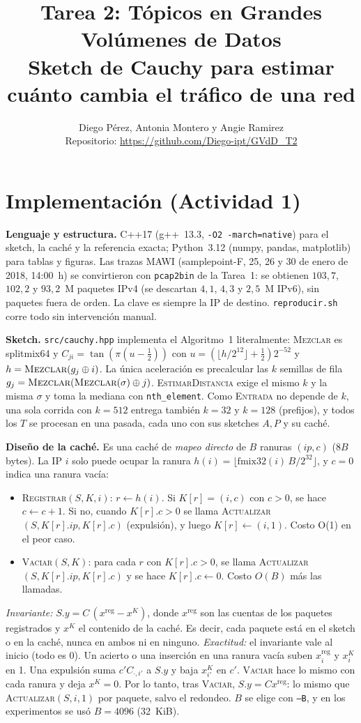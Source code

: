 \documentclass[conference]{IEEEtran}
\title{Tarea 2: Tópicos en Grandes Volúmenes de Datos\\
Sketch de Cauchy para estimar cuánto cambia el tráfico de una red}
\author{Diego Pérez, Antonia Montero y Angie Ramirez\\
Repositorio: \url{https://github.com/Diego-ipt/GVdD_T2}}
\begin{document}
\maketitle

\section{Implementación (Actividad 1)}

\textbf{Lenguaje y estructura.} C++17 (g++~13.3, \texttt{-O2 -march=native}) para el sketch, la caché y la referencia exacta; Python~3.12 (numpy, pandas, matplotlib) para tablas y figuras. Las trazas MAWI (samplepoint-F, 25, 26 y 30 de enero de 2018, 14:00~h) se convirtieron con \texttt{pcap2bin} de la Tarea~1: se obtienen $103{,}7$, $102{,}2$ y $93{,}2$~M paquetes IPv4 (se descartan $4{,}1$, $4{,}3$ y $2{,}5$~M IPv6), sin paquetes fuera de orden. La clave es siempre la IP de destino. \texttt{reproducir.sh} corre todo sin intervención manual.

\textbf{Sketch.} \texttt{src/cauchy.hpp} implementa el Algoritmo~1 literalmente: \textsc{Mezclar} es splitmix64 y $C_{ji}=\tan(\pi(u-\frac12))$ con $u=(\lfloor h/2^{12}\rfloor+\frac12)2^{-52}$ y $h=\textsc{Mezclar}(g_j\oplus i)$. La única aceleración es precalcular las $k$ semillas de fila $g_j=\textsc{Mezclar}(\textsc{Mezclar}(\sigma)\oplus j)$. \textsc{EstimarDistancia} exige el mismo $k$ y la misma $\sigma$ y toma la mediana con \texttt{nth\_element}. Como \textsc{Entrada} no depende de $k$, una sola corrida con $k=512$ entrega también $k=32$ y $k=128$ (prefijos), y todos los $T$ se procesan en una pasada, cada uno con sus sketches $A,P$ y su caché.

\textbf{Diseño de la caché.} Es una caché de \emph{mapeo directo} de $B$ ranuras $(ip,c)$ ($8B$ bytes). La IP $i$ solo puede ocupar la ranura $h(i)=\lfloor \mathrm{fmix32}(i)\,B/2^{32}\rfloor$, y $c=0$ indica una ranura vacía:
\begin{itemize}
\item \textsc{Registrar}$(S,K,i)$: $r\gets h(i)$. Si $K[r]=(i,c)$ con $c>0$, se hace $c\gets c+1$. Si no, cuando $K[r].c>0$ se llama \textsc{Actualizar}$(S,K[r].ip,K[r].c)$ (expulsión), y luego $K[r]\gets(i,1)$. Costo O(1) en el peor caso.
\item \textsc{Vaciar}$(S,K)$: para cada $r$ con $K[r].c>0$, se llama \textsc{Actualizar}$(S,K[r].ip,K[r].c)$ y se hace $K[r].c\gets 0$. Costo $O(B)$ más las llamadas.
\end{itemize}
\emph{Invariante:} $S.y = C\,(x^{\mathrm{reg}}-x^{K})$, donde $x^{\mathrm{reg}}$ son las cuentas de los paquetes registrados y $x^K$ el contenido de la caché. Es decir, cada paquete está en el sketch o en la caché, nunca en ambos ni en ninguno. \emph{Exactitud:} el invariante vale al inicio (todo es 0). Un acierto o una inserción en una ranura vacía suben $x^{\mathrm{reg}}_i$ y $x^K_i$ en 1. Una expulsión suma $c'C_{\cdot,i'}$ a $S.y$ y baja $x^K_{i'}$ en $c'$. \textsc{Vaciar} hace lo mismo con cada ranura y deja $x^K=0$. Por lo tanto, tras \textsc{Vaciar}, $S.y=Cx^{\mathrm{reg}}$: lo mismo que \textsc{Actualizar}$(S,i,1)$ por paquete, salvo el redondeo. $B$ se elige con \texttt{--B}, y en los experimentos se usó $B=4096$ (32~KiB).
\end{document}
